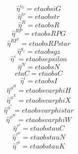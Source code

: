 \begin{dmath}
{\hat{\eta}^{i_G}}={etaobsiG}
\end{dmath}
\begin{dmath}
{\hat{\eta}^{tr}}={etaobstr}
\end{dmath}
\begin{dmath}
{\hat{\eta}^{R}}={etaobsR}
\end{dmath}
\begin{dmath}
{\hat{\eta}^{RP}}={etaobsRPG}
\end{dmath}
\begin{dmath}
{\hat{\eta}^{RP^*}}={etaobsRPstar}
\end{dmath}
\begin{dmath}
{\hat{\eta}^{g_z}}={etaobsgz}
\end{dmath}
\begin{dmath}
{\hat{\eta}^{\varepsilon}}={etaobsepsilon}
\end{dmath}
\begin{dmath}
{\hat{\eta}^{N}}={etaobsN}
\end{dmath}
\begin{dmath}
{etaC}={etaobsC}
\end{dmath}
\begin{dmath}
{\hat{\eta}^{i}}={etaobsI}
\end{dmath}
\begin{dmath}
{\hat{\eta}^{\phi^H}}={etaobsvarphiH}
\end{dmath}
\begin{dmath}
{\hat{\eta}^{\phi^X}}={etaobsvarphiX}
\end{dmath}
\begin{dmath}
{\hat{\eta}^{\phi^*}}={etaobsvarphistar}
\end{dmath}
\begin{dmath}
{\hat{\eta}^{\phi^W}}={etaobsvarphiW}
\end{dmath}
\begin{dmath}
{\hat{\eta}^{\tau^c}}={etaobstauC}
\end{dmath}
\begin{dmath}
{\hat{\eta}^{\tau^w}}={etaobstauN}
\end{dmath}
\begin{dmath}
{\hat{\eta}^{\tau^k}}={etaobstauK}
\end{dmath}

